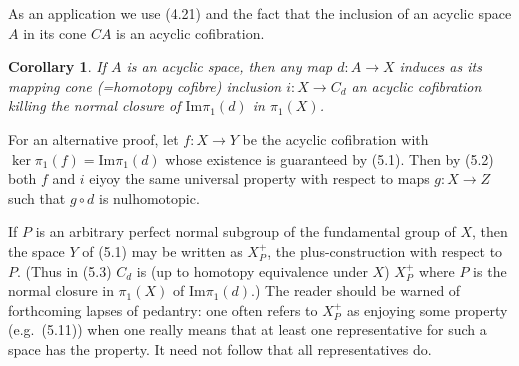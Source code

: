 \documentclass[openany,leqno]{book}  %
\newcommand{\ima}{\mathrm{Im}}
\newtheorem{corollary}[theorem]{Corollary}
\begin{document}
 
As an application we use (4.21) and the fact that the inclusion of an acyclic space $A$ in its cone
$CA$ is an acyclic cofibration.
\begin{corollary}
  If $A$ is an acyclic space, then any map $d \colon   A \longrightarrow X$ induces as its mapping cone (=homotopy cofibre) inclusion $i\colon   X \longrightarrow C_d$ an acyclic cofibration killing the normal closure of $\ima \pi_1(d)$ in $\pi_1(X)$.
\end{corollary}

For an alternative proof, let $f \colon   X \longrightarrow Y$ be the acyclic cofibration with $\ker \pi_1(f) = \ima \pi_1(d)$ whose existence is guaranteed by (5.1). Then by (5.2) both $f$ and $i$ eiyoy the same universal property with respect to maps $g \colon   X \longrightarrow  Z$ such that $g\circ d$ is nulhomotopic.

If $P$ is an arbitrary perfect normal subgroup of the fundamental group of $X$, then the space $Y$
of (5.1) may be written as $X_P^+$, the plus-construction with respect to $P$. (Thus in (5.3) $C_d$ is (up to homotopy equivalence under $X$) $X_P^+$ where $P$ is the normal closure in $\pi_1(X)$ of $\ima \pi_1(d)$.) The reader should be warned of forthcoming lapses of pedantry: one often refers to $X_P^+$ as enjoying some property (e.g.\  (5.11)) when one really means that at least one representative for such a space has the property. It need not follow that all representatives do.
\end{document}
